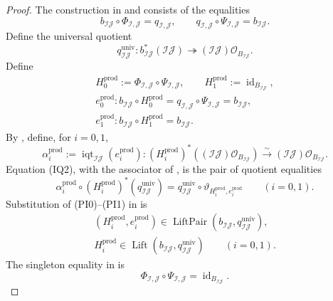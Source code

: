 \begin{proof}
  The construction in
   and
   consists of the equalities
  \[
    b_{\mathcal I\mathcal J}\circ\Phi_{\mathcal I,\mathcal J}
      =q_{\mathcal I,\mathcal J},
    \qquad
    q_{\mathcal I,\mathcal J}\circ\Psi_{\mathcal I,\mathcal J}
      =b_{\mathcal I\mathcal J}.
  \]
  Define the universal quotient
  \[
    q_{\mathcal I\mathcal J}^{\mathrm{univ}}\colon
    b_{\mathcal I\mathcal J}^*(\mathcal I\mathcal J)
      \twoheadrightarrow
      (\mathcal I\mathcal J)\mathcal O_{B_{\mathcal I\mathcal J}}.
  \]
  Define
  \[
  \begin{gathered}
    H_0^{\mathrm{prod}}
      :=\Phi_{\mathcal I,\mathcal J}\circ\Psi_{\mathcal I,\mathcal J},
    \qquad
    H_1^{\mathrm{prod}}:=\operatorname{id}_{B_{\mathcal I\mathcal J}},\\
    e_0^{\mathrm{prod}}\colon
      b_{\mathcal I\mathcal J}\circ H_0^{\mathrm{prod}}
      =q_{\mathcal I,\mathcal J}\circ\Psi_{\mathcal I,\mathcal J}
      =b_{\mathcal I\mathcal J},\\
    e_1^{\mathrm{prod}}\colon
      b_{\mathcal I\mathcal J}\circ H_1^{\mathrm{prod}}
      =b_{\mathcal I\mathcal J}.
  \end{gathered}                                                   \tag{PI0}
  \]
  By , define, for $i=0,1$,
  \[
    \alpha_i^{\mathrm{prod}}
      :=\operatorname{iqt}_{\mathcal I\mathcal J}
          (e_i^{\mathrm{prod}})\colon
      (H_i^{\mathrm{prod}})^*
        ((\mathcal I\mathcal J)\mathcal O_{B_{\mathcal I\mathcal J}})
      \xrightarrow{\sim}
        (\mathcal I\mathcal J)\mathcal O_{B_{\mathcal I\mathcal J}}.
  \]
  Equation (IQ2), with the associator of
  , is the pair of quotient equalities
  \[
    \alpha_i^{\mathrm{prod}}\circ
      (H_i^{\mathrm{prod}})^*(q_{\mathcal I\mathcal J}^{\mathrm{univ}})
      =q_{\mathcal I\mathcal J}^{\mathrm{univ}}\circ
        \vartheta_{H_i^{\mathrm{prod}},e_i^{\mathrm{prod}}}
      \qquad(i=0,1).                                               \tag{PI1}
  \]
  Substitution of (PI0)--(PI1) in
   is
  \[
  \begin{gathered}
    (H_i^{\mathrm{prod}},e_i^{\mathrm{prod}})
      \in\operatorname{LiftPair}
        (b_{\mathcal I\mathcal J},q_{\mathcal I\mathcal J}^{\mathrm{univ}}),\\
    H_i^{\mathrm{prod}}
      \in\operatorname{Lift}
        (b_{\mathcal I\mathcal J},q_{\mathcal I\mathcal J}^{\mathrm{univ}})
      \qquad(i=0,1).
  \end{gathered}                                                   \tag{PI2}
  \]
  The singleton equality in
   is
  \[
    \Phi_{\mathcal I,\mathcal J}\circ\Psi_{\mathcal I,\mathcal J}
      =\operatorname{id}_{B_{\mathcal I\mathcal J}}.
  \]


\end{proof}
